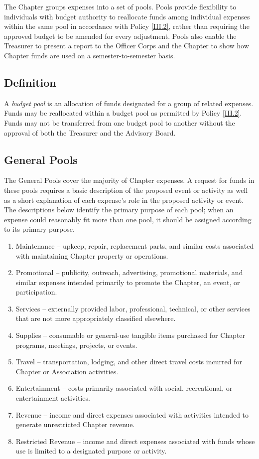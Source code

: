 The Chapter groups expenses into a set of pools. 
Pools provide flexibility to individuals with budget authority to reallocate funds among individual expenses within the same pool in accordance 
with Policy \ref{III.2}, rather than requiring the approved budget to be amended for every adjustment. 
Pools also enable the Treasurer to present a report to the Officer Corps and the Chapter to show how Chapter funds are used on a semester-to-semester basis.

\subsection{Definition} \label{II.1}
A \textit{budget pool} is an allocation of funds designated for a group of related expenses. 
Funds may be reallocated within a budget pool as permitted by Policy \ref{III.2}. 
Funds may not be transferred from one budget pool to another without the approval of both the Treasurer and the Advisory Board.

\subsection{General Pools} \label{II.2}
The General Pools cover the majority of Chapter expenses. 
A request for funds in these pools requires a basic description of the proposed event or activity as well as a short explanation of each expense’s role in the proposed activity or event. 
The descriptions below identify the primary purpose of each pool; when an expense could reasonably fit more than one pool, it should be assigned according to its primary purpose.
\begin{enumerate}
    \item Maintenance – upkeep, repair, replacement parts, and similar costs associated with maintaining Chapter property or operations.
    \item Promotional – publicity, outreach, advertising, promotional materials, and similar expenses intended primarily to promote the Chapter, an event, or participation.
    \item Services – externally provided labor, professional, technical, or other services that are not more appropriately classified elsewhere.
    \item Supplies – consumable or general-use tangible items purchased for Chapter programs, meetings, projects, or events.
    \item Travel – transportation, lodging, and other direct travel costs incurred for Chapter or Association activities.
    \item Entertainment – costs primarily associated with social, recreational, or entertainment activities.
    \item Revenue – income and direct expenses associated with activities intended to generate unrestricted Chapter revenue.
    \item Restricted Revenue – income and direct expenses associated with funds whose use is limited to a designated purpose or activity.
\end{enumerate}


